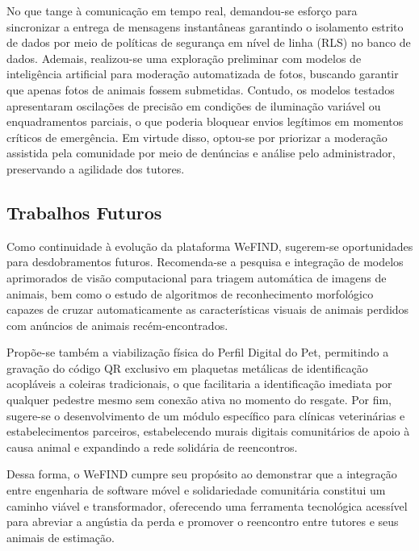 No que tange à comunicação em tempo real, demandou-se esforço para sincronizar a entrega de mensagens instantâneas garantindo o isolamento estrito de dados por meio de políticas de segurança em nível de linha (RLS) no banco de dados. Ademais, realizou-se uma exploração preliminar com modelos de inteligência artificial para moderação automatizada de fotos, buscando garantir que apenas fotos de animais fossem submetidas. Contudo, os modelos testados apresentaram oscilações de precisão em condições de iluminação variável ou enquadramentos parciais, o que poderia bloquear envios legítimos em momentos críticos de emergência. Em virtude disso, optou-se por priorizar a moderação assistida pela comunidade por meio de denúncias e análise pelo administrador, preservando a agilidade dos tutores.

\subsection{Trabalhos Futuros}

Como continuidade à evolução da plataforma WeFIND, sugerem-se oportunidades para desdobramentos futuros. Recomenda-se a pesquisa e integração de modelos aprimorados de visão computacional para triagem automática de imagens de animais, bem como o estudo de algoritmos de reconhecimento morfológico capazes de cruzar automaticamente as características visuais de animais perdidos com anúncios de animais recém-encontrados.

Propõe-se também a viabilização física do Perfil Digital do Pet, permitindo a gravação do código QR exclusivo em plaquetas metálicas de identificação acopláveis a coleiras tradicionais, o que facilitaria a identificação imediata por qualquer pedestre mesmo sem conexão ativa no momento do resgate. Por fim, sugere-se o desenvolvimento de um módulo específico para clínicas veterinárias e estabelecimentos parceiros, estabelecendo murais digitais comunitários de apoio à causa animal e expandindo a rede solidária de reencontros.

Dessa forma, o WeFIND cumpre seu propósito ao demonstrar que a integração entre engenharia de software móvel e solidariedade comunitária constitui um caminho viável e transformador, oferecendo uma ferramenta tecnológica acessível para abreviar a angústia da perda e promover o reencontro entre tutores e seus animais de estimação.
\clearpage

